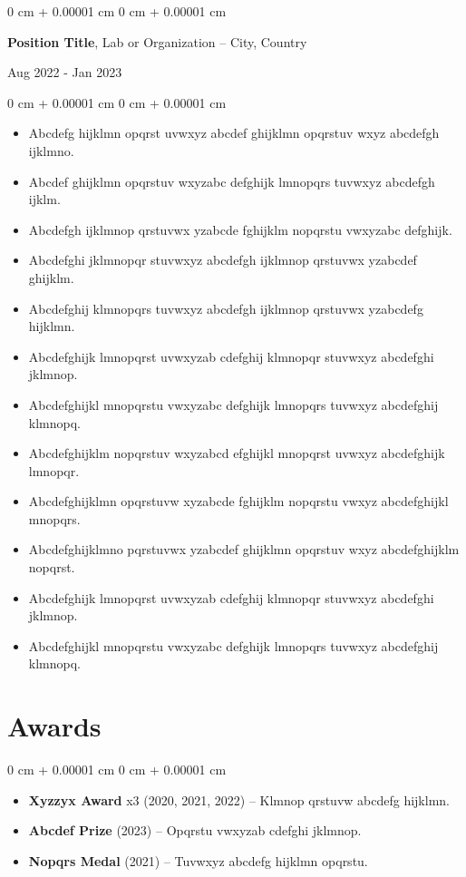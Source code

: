 \documentclass[11pt, letterpaper]{article}
\newenvironment{highlights}{
    \begin{itemize}[
        topsep=0.08 cm,
        parsep=0.08 cm,
        partopsep=0pt,
        itemsep=0pt,
        leftmargin=0.2 cm + 17pt
    ]
}
{
    \end{itemize}
}
\newenvironment{onecolentry}{
    \begin{adjustwidth}{
        0 cm + 0.00001 cm
    }{
        0 cm + 0.00001 cm
    }
}{
    \end{adjustwidth}
}
\newenvironment{twocolentry}[2][]{
    \onecolentry
    \def\secondColumn{#2}
    \setcolumnwidth{\fill, 4.5 cm}
    \begin{paracol}{2}
}{
    \switchcolumn \raggedleft \secondColumn
    \end{paracol}
    \endonecolentry
}
\begin{document}
\begin{twocolentry}{Aug 2022 - Jan 2023}
    {\textbf{Position Title}}, Lab or Organization -- City, Country  
\end{twocolentry}  
\vspace{0.1cm}
\begin{onecolentry}
    \begin{highlights}
        \item Abcdefg hijklmn opqrst uvwxyz abcdef ghijklmn opqrstuv wxyz abcdefgh ijklmno.
        \item Abcdef ghijklmn opqrstuv wxyzabc defghijk lmnopqrs tuvwxyz abcdefgh ijklm.
        \item Abcdefgh ijklmnop qrstuvwx yzabcde fghijklm nopqrstu vwxyzabc defghijk.
        \item Abcdefghi jklmnopqr stuvwxyz abcdefgh ijklmnop qrstuvwx yzabcdef ghijklm.
        \item Abcdefghij klmnopqrs tuvwxyz abcdefgh ijklmnop qrstuvwx yzabcdefg hijklmn.
        \item Abcdefghijk lmnopqrst uvwxyzab cdefghij klmnopqr stuvwxyz abcdefghi jklmnop.
        \item Abcdefghijkl mnopqrstu vwxyzabc defghijk lmnopqrs tuvwxyz abcdefghij klmnopq.
        \item Abcdefghijklm nopqrstuv wxyzabcd efghijkl mnopqrst uvwxyz abcdefghijk lmnopqr.
        \item Abcdefghijklmn opqrstuvw xyzabcde fghijklm nopqrstu vwxyz abcdefghijkl mnopqrs.
        \item Abcdefghijklmno pqrstuvwx yzabcdef ghijklmn opqrstuv wxyz abcdefghijklm nopqrst.
        \item Abcdefghijk lmnopqrst uvwxyzab cdefghij klmnopqr stuvwxyz abcdefghi jklmnop.
        \item Abcdefghijkl mnopqrstu vwxyzabc defghijk lmnopqrs tuvwxyz abcdefghij klmnopq.
    \end{highlights}
\end{onecolentry}

\section{Awards}
\vspace{0.08 cm}
\begin{onecolentry}
    \begin{highlights}
        \item \textbf{Xyzzyx Award} x3 (2020, 2021, 2022) -- Klmnop qrstuvw abcdefg hijklmn.
        \item \textbf{Abcdef Prize} (2023) -- Opqrstu vwxyzab cdefghi jklmnop.
        \item \textbf{Nopqrs Medal} (2021) -- Tuvwxyz abcdefg hijklmn opqrstu.
    \end{highlights}
\end{onecolentry}
\end{document}
